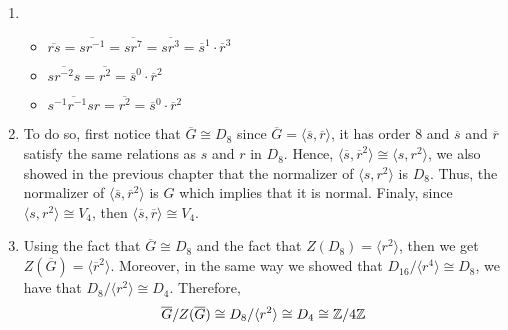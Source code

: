 \begin{solution}
\begin{enumerate}[label = \textbf{(\alph*)}]
        \item \begin{itemize}
            \item $\overline{rs} = \overline{sr^{-1}} = \overline{sr^7} = \overline{sr^3} = \overline{s}^1\cdot\overline{r}^3$
            \item $\overline{sr^{-2}s} = \overline{r^2} = \overline{s}^0\cdot\overline{r}^2$
            \item $\overline{s^{-1}r^{-1}sr} = \overline{r^2} = \overline{s}^0\cdot\overline{r}^2$
        \end{itemize}

        \item To do so, first notice that $\overline{G} \cong D_8$ since $\overline{G} = \langle \overline{s}, \overline{r} \rangle$, it has order 8 and $\overline{s}$ and $\overline{r}$ satisfy the same relations as $s$ and $r$ in $D_8$. Hence, $\langle \overline{s}, \overline{r}^2 \rangle \cong \langle s,r^2 \rangle$, we also showed in the previous chapter that the normalizer of $\langle s,r^2 \rangle$ is $D_8$. Thus, the normalizer of $\langle \overline{s}, \overline{r}^2 \rangle$ is $G$ which implies that it is normal. Finaly, since $\langle s,r^2 \rangle \cong V_4$, then $\langle \overline{s}, \overline{r} \rangle \cong V_4$.
        
        \item Using the fact that $\overline{G} \cong D_8$ and the fact that $Z(D_8) = \langle r^2 \rangle$, then we get $Z(\overline{G}) = \langle \overline{r}^2 \rangle$. Moreover, in the same way we showed that $D_{16}/\langle r^4 \rangle \cong D_8$, we have that $D_8/\langle r^2 \rangle \cong D_4$. Therefore,
        $$\overline{G}/Z(\overline{G}) \cong D_8/\langle r^2 \rangle \cong D_4 \cong \mathbb{Z} / 4  \mathbb{Z}$$
    \end{enumerate}
\end{solution}